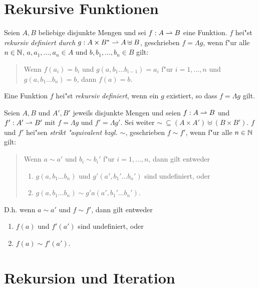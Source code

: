 \documentclass[12pt,a4paper]{article}
\begin{document}
\section{Rekursive Funktionen}

Seien $A,B$ beliebige disjunkte Mengen und sei $f: A \rightharpoonup B$ eine Funktion. $f$ hei"st \emph{rekursiv
definiert durch $g:A \times B^* \rightharpoonup A \uplus B$}, geschrieben $f = \Lambda g$, wenn f"ur alle
$n \in \mathbb N$, $a,a_1,\ldots,a_n \in A$ und $b,b_1,\ldots,b_n \in B$ gilt:
\begin{quote}
  Wenn $f(a_i) = b_i$ und $g(a,b_1 \ldots b_{i-1}) = a_i$ f"ur $i = 1,\ldots,n$ und
  $g(a,b_1 \ldots b_n) = b$, dann $f(a) = b$.
\end{quote}
Eine Funktion $f$ hei"st \emph{rekursiv definiert}, wenn ein $g$ existiert, so dass $f = \Lambda g$
gilt.

Seien $A,B$ und $A',B'$ jeweils disjunkte Mengen und seien $f: A \rightharpoonup B$ und $f': A' \rightharpoonup B'$ mit
$f = \Lambda g$ und $f' = \Lambda g'$. Sei weiter $\sim\ \subseteq (A \times A') \uplus (B \times B')$.
$f$ und $f'$ hei"sen \emph{strikt "aquivalent bzgl. $\sim$}, geschrieben $f \sim f'$, wenn f"ur alle $n \in \mathbb N$ gilt:
\begin{quote}
  Wenn $a \sim a'$ und $b_i \sim b_i'$ f"ur $i = 1,\ldots,n$, dann gilt entweder
  \begin{enumerate}
  \item $g(a,b_1 \ldots b_n)$ und $g'(a',b_1' \ldots b_n')$ sind undefiniert, oder
  \item $g(a,b_1 \ldots b_n) \sim g'a(a',b_1' \ldots b_n')$.
  \end{enumerate}
\end{quote}
D.h. wenn $a \sim a'$ und $f \sim f'$, dann gilt entweder
\begin{enumerate}
\item $f(a)$ und $f'(a')$ sind undefiniert, oder
\item $f(a) \sim f'(a')$.
\end{enumerate}


\section{Rekursion und Iteration}
\end{document}
